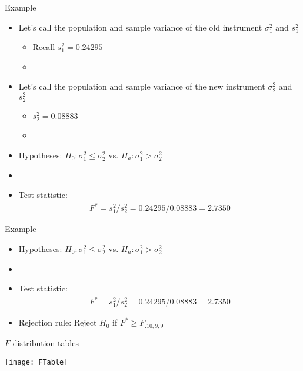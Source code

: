\documentclass[xcolor=dvipsnames]{beamer}
\begin{document}
\begin{frame}{Example}
	\begin{itemize}
		\item Let's call the population and sample variance of the old instrument $\sigma_1^2$ and $s_1^2$ \pause
		\begin{itemize}
			\item Recall $s_1^2 = 0.24295$ \pause
			\item[]
		\end{itemize}
		\item Let's call the population and sample variance of the new instrument $\sigma_2^2$ and $s_2^2$ \pause
		\begin{itemize}
			\item $s_2^2 = 0.08883$ \pause
			\item[]
		\end{itemize}

		\item Hypotheses: $H_0: \sigma_1^2 \leq \sigma_2^2$ vs. $H_a: \sigma_1^2 > \sigma_2^2$ \pause
		\item[]
		\item Test statistic: 
		\begin{gather*}
		F^* = s_1^2 /s_2^2 = 0.24295 /  0.08883 = 2.7350
		\end{gather*}
	\end{itemize}
\end{frame}

\begin{frame}{Example}
	\begin{itemize}		
		\item Hypotheses: $H_0: \sigma_1^2 \leq \sigma_2^2$ vs. $H_a: \sigma_1^2 > \sigma_2^2$
		\item[]
		\item Test statistic:
		\begin{gather*}
		F^* = s_1^2 /s_2^2 = 0.24295 /  0.08883 = 2.7350
		\end{gather*}
		\item Rejection rule: Reject $H_0$ if $F^* \geq F_{.10, 9, 9}$
	\end{itemize}
\end{frame}

\begin{frame}{$F$-distribution tables}
	\begin{center}
		\texttt{[image: FTable]}
	\end{center}
\end{frame}
\end{document}
